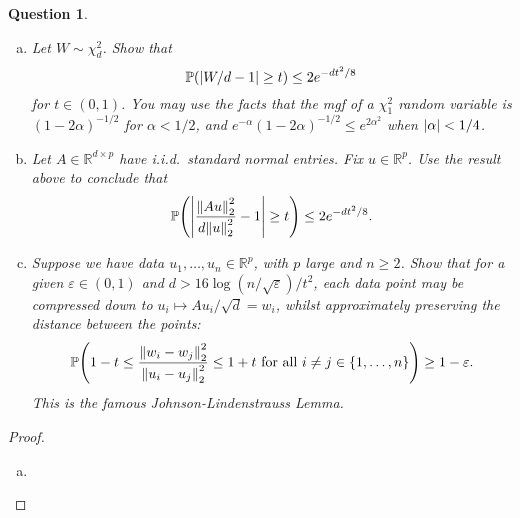 \documentclass{article}
\theoremstyle{plain}
\newtheorem{question}{Question}
\theoremstyle{remark}
\renewcommand{\epsilon}{\varepsilon}
\newcommand{\Bb}{\mathbb}
\newcommand{\PP}{\Bb P}
\newcommand{\RR}{\Bb R}
\newcommand\eps\epsilon
\begin{document}
\begin{question}
	\begin{enumerate}[(a)]
		\item Let $W \sim \chi_d^2$. Show that
		\[
		\PP(\abs{W/d - 1} \geq t) \leq 2e^{-dt^2/8}
		\]
		for $t \in (0, 1)$. You may use the facts that the mgf of a $\chi_1^2$ random variable is $(1 - 2\alpha)^{-1/2}$ for $\alpha < 1/2$, and $e^{-\alpha} (1 - 2\alpha)^{-1/2} \leq e^{2\alpha^2}$ when $\abs{\alpha} < 1/4$. 
		
		\item Let $A \in \RR^{d\times p}$ have i.i.d.\ standard normal entries. Fix $u \in \RR^p$. Use the result above to conclude that
		\[
		\PP\qty(\abs{\frac{\norm{Au}_2^2}{d \norm{u}_2^2} - 1} \geq t) \leq 2e^{-dt^2/8}. 
		\]
		
		\item Suppose we have data $u_1, \dotsc, u_n \in \RR^p$, with $p$ large and $n \geq 2$. Show that for a given $\eps \in (0, 1)$ and $d > 16\log(n/\sqrt\eps)/t^2$, each data point may be compressed down to $u_i \mapsto Au_i/\sqrt d = w_i$, whilst approximately preserving the distance between the points:
		\[
		\PP\qty(1 - t \leq \frac{\norm{w_i - w_j}_2^2}{\norm{u_i - u_j}_2^2} \leq 1 + t \text{ for all } i \neq j \in \qty{1, \dotsc, n}) \geq 1 - \eps. 
		\]
		This is the famous Johnson-Lindenstrauss Lemma. 
	\end{enumerate}
\end{question}

\begin{proof}
	\begin{enumerate}[(a)]
		\item 
	\end{enumerate}
\end{proof}
\end{document}

